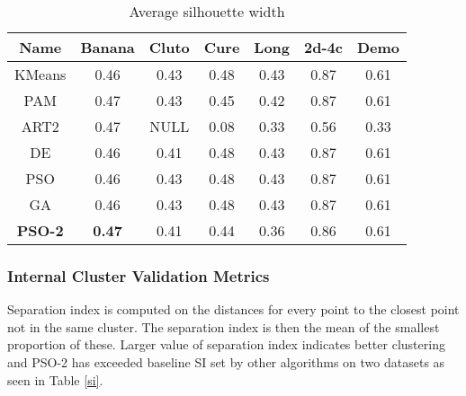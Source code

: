 \documentclass[conference]{IEEEtran}
\begin{document}
\begin{table}[H]
\caption{Average silhouette width}
\label{asw}
\centering
\begin{tabular}{||c|c|c|c|c|c|c||}
  \hline
\multicolumn{1}{|c|}{\textbf{Name}} & \multicolumn{1}{c|}{\textbf{Banana}} & \multicolumn{1}{c|}{\textbf{Cluto}} & \multicolumn{1}{c|}{\textbf{Cure}} & \multicolumn{1}{c|}{\textbf{Long}} & \multicolumn{1}{c|}{\textbf{2d-4c}} & \multicolumn{1}{c|}{\textbf{Demo}}\\
  \hline\hline
  KMeans & 0.46 & 0.43 & 0.48 & 0.43 & 0.87 & 0.61 \\ [0.5ex]
   \hline
  PAM & 0.47 & 0.43 & 0.45 & 0.42 & 0.87 & 0.61 \\
   \hline
  ART2 & 0.47 & NULL & 0.08 & 0.33 & 0.56 & 0.33 \\
   \hline
  DE & 0.46 & 0.41 & 0.48 & 0.43 & 0.87 & 0.61 \\
   \hline
  PSO & 0.46 & 0.43 & 0.48 & 0.43 & 0.87 & 0.61 \\
   \hline
  GA & 0.46 & 0.43 & 0.48 & 0.43 & 0.87 & 0.61
 \\
   \hline
  \textbf{PSO-2} &  \textbf{0.47} & 0.41 &  0.44 & 0.36 & 0.86 & 0.61 \\  [1ex]
  \hline
\end{tabular}
\end{table}

\subsubsection{Internal Cluster Validation Metrics}

Separation index is computed on the distances for every point to the closest point not in the same cluster. The separation index is then the mean of the smallest proportion of these. Larger value of separation index indicates better clustering and PSO-2 has exceeded baseline SI set by other algorithms on two datasets as seen in Table \ref{si}.
\end{document}
